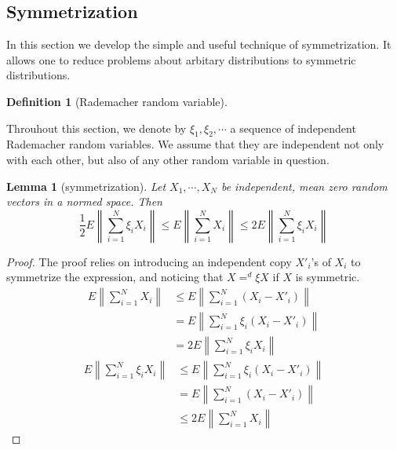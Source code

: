 \documentclass{article}
\newtheorem{Lem}{Lemma}[section]
\theoremstyle{definition}
\newtheorem{Def}{Definition}[section]
\begin{document}
\subsection{Symmetrization}
In this section we develop the simple and useful technique of symmetrization.
It allows one to reduce problems about arbitary distributions to symmetric distributions.
\begin{Def}[Rademacher random variable]
    
\end{Def}
Throuhout this section, we denote by $\xi_1,\xi_2,\cdots$ a sequence of independent Rademacher random variables.
We assume that they are independent not only with each other, but also of any other random variable in question.
\begin{Lem}[symmetrization]
    Let $X_1,\cdots,X_N$ be independent, mean zero random vectors in a normed space. Then 
    \[\frac{1}{2}E\left\|\sum_{i=1}^N\xi_iX_i\right\|\le E\left\|\sum_{i=1}^NX_i\right\|\le 2E\left\|\sum_{i=1}^N\xi_iX_i\right\|\]
\end{Lem}
\begin{proof}
    The proof relies on introducing an independent copy $X'_i$'s of $X_i$ to symmetrize the expression,
    and noticing that $X=^d \xi X$ if $X$ is symmetric.
    \begin{align*}
        E\left\|\sum_{i=1}^NX_i\right\|&\le E\left\|\sum_{i=1}^N(X_i-X'_i)\right\|\\
        &=E\left\|\sum_{i=1}^N\xi_i(X_i-X'_i)\right\|\\
        &=2 E\left\|\sum_{i=1}^N\xi_iX_i\right\|
    \end{align*}
    \begin{align*}
        E\left\|\sum_{i=1}^N\xi_iX_i\right\|&\le E\left\|\sum_{i=1}^N\xi_i(X_i-X'_i)\right\|\\
        &=E\left\|\sum_{i=1}^N(X_i-X'_i)\right\|\\
        &\le 2E\left\|\sum_{i=1}^NX_i\right\|
    \end{align*}
        
\end{proof}
\end{document}
